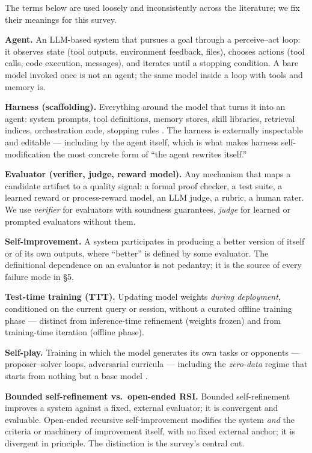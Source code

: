 \documentclass[
  11pt,
]{article}
\begin{document}
The terms below are used loosely and inconsistently across the
literature; we fix their meanings for this survey.

\textbf{Agent.} An LLM-based system that pursues a goal through a
perceive--act loop: it observes state (tool outputs, environment
feedback, files), chooses actions (tool calls, code execution,
messages), and iterates until a stopping condition. A bare model invoked
once is not an agent; the same model inside a loop with tools and memory
is.

\textbf{Harness (scaffolding).} Everything around the model that turns
it into an agent: system prompts, tool definitions, memory stores, skill
libraries, retrieval indices, orchestration code, stopping rules
\citep{macedo2026stop}. The harness is externally inspectable and
editable --- including by the agent itself, which is what makes harness
self-modification the most concrete form of ``the agent rewrites
itself.''

\textbf{Evaluator (verifier, judge, reward model).} Any mechanism that
maps a candidate artifact to a quality signal: a formal proof checker, a
test suite, a learned reward or process-reward model, an LLM judge, a
rubric, a human rater. We use \emph{verifier} for evaluators with
soundness guarantees, \emph{judge} for learned or prompted evaluators
without them.

\textbf{Self-improvement.} A system participates in producing a better
version of itself or of its own outputs, where ``better'' is defined by
some evaluator. The definitional dependence on an evaluator is not
pedantry; it is the source of every failure mode in §5.

\textbf{Test-time training (TTT).} Updating model weights \emph{during
deployment}, conditioned on the current query or session, without a
curated offline training phase --- distinct from inference-time
refinement (weights frozen) and from training-time iteration (offline
phase).

\textbf{Self-play.} Training in which the model generates its own tasks
or opponents --- proposer--solver loops, adversarial curricula ---
including the \emph{zero-data} regime that starts from nothing but a
base model \citep{zhao2025absolutezero, huang2025rzero}.

\textbf{Bounded self-refinement vs.~open-ended RSI.} Bounded
self-refinement improves a system against a fixed, external evaluator;
it is convergent and evaluable. Open-ended recursive self-improvement
modifies the system \emph{and} the criteria or machinery of improvement
itself, with no fixed external anchor; it is divergent in principle. The
distinction is the survey's central cut.
\end{document}
